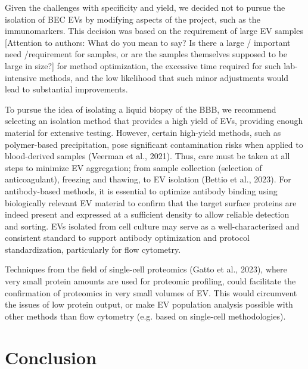 \documentclass[authordate, empirical]{jote-new-article}
\begin{document}
	Given the challenges with specificity and yield, we decided not to pursue the isolation of BEC EVs by modifying aspects of the project, such as the immunomarkers. This decision was based on the requirement of large EV samples [Attention to authors: What do you mean to say? Is there a large / important need /requirement for samples, or are the samples themselves supposed to be large in size?] for method optimization, the excessive time required for such lab-intensive methods, and the low likelihood that such minor adjustments would lead to substantial improvements.



	To pursue the idea of isolating a liquid biopsy of the BBB, we recommend selecting an isolation method that provides a high yield of EVs, providing enough material for extensive testing. However, certain high-yield methods, such as polymer-based precipitation, pose significant contamination risks when applied to blood-derived samples (Veerman et al., 2021). Thus, care must be taken at all steps to minimize EV aggregation; from sample collection (selection of anticoagulant), freezing and thawing, to EV isolation (Bettio et al., 2023). For antibody-based methods, it is essential to optimize antibody binding using biologically relevant EV material to confirm that the target surface proteins are indeed present and expressed at a sufficient density to allow reliable detection and sorting. EVs isolated from cell culture may serve as a well-characterized and consistent standard to support antibody optimization and protocol standardization, particularly for flow cytometry.



	Techniques from the field of single-cell proteomics (Gatto et al., 2023), where very small protein amounts are used for proteomic profiling, could facilitate the confirmation of proteomics in very small volumes of EV. This would circumvent the issues of low protein output, or make EV population analysis possible with other methods than flow cytometry (e.g. based on single-cell methodologies).











	\section{Conclusion }
\end{document}
